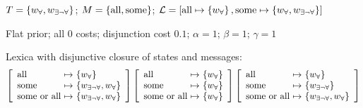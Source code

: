 \documentclass{article}
\begin{document}
\newcommand{\scalarlex}[3]{
  \left[
    \begin{array}[c]{l@{ \ \mapsto \ } l}
      \mAll & \set{#1} \\
      \mSome & \set{#2} \\
      \mSomevAll & \set{#3} \\
    \end{array}
  \right]}

\begin{examples}
\item
  \begin{examples}
  \item $T = \left\{ w_{\forall}, w_{\exists\neg\forall} \right\}$; $M = \left\{ \text{all}, \text{some} \right\}$; $\mathcal{L} = [\text{all} \mapsto \left\{ w_{\forall} \right\}, \text{some} \mapsto \left\{ w_{\forall},w_{\exists\neg\forall} \right\}]$
  \item Flat prior; all $0$ costs; disjunction cost $0.1$; $\alpha = 1$; $\beta = 1$; $\gamma = 1$  
  \item Lexica with disjunctive closure of states and messages:
    \setlength{\arraycolsep}{2pt}
    \[
    \scalarlex{\wALL}{\wSOMENOTALL,\wALL}{\wSOMENOTALL, \wALL}
    \hfill
    \scalarlex{\wALL}{\wALL}{\wALL}
    \hfill
    \scalarlex{\wALL}{\wSOMENOTALL}{\wSOMENOTALL, \wALL} 
    \]
  \end{examples}
\end{examples}
\end{document}
